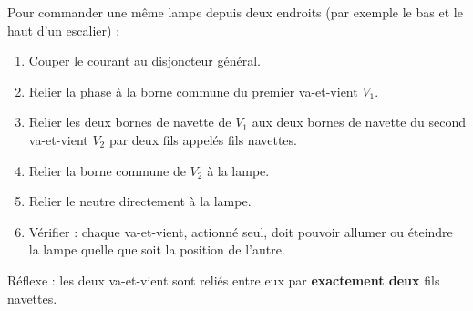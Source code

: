 \documentclass[11pt]{article}
\newcommand{\cle}[1]{{\popxbold\color{popdark}#1}}
\begin{document}
\begin{methode}
Pour commander une même lampe depuis deux endroits (par exemple le bas et le haut d'un escalier) :
\begin{enumerate}
\item Couper le courant au disjoncteur général.
\item Relier la \cle{phase} à la borne commune du premier va-et-vient $V_1$.
\item Relier les deux bornes de navette de $V_1$ aux deux bornes de navette du second va-et-vient $V_2$ par deux fils appelés \cle{fils navettes}.
\item Relier la borne commune de $V_2$ à la lampe.
\item Relier le \cle{neutre} directement à la lampe.
\item Vérifier : chaque va-et-vient, actionné seul, doit pouvoir allumer ou éteindre la lampe quelle que soit la position de l'autre.
\end{enumerate}
Réflexe : les deux va-et-vient sont reliés entre eux par \textbf{exactement deux} fils navettes.
\end{methode}
\end{document}
